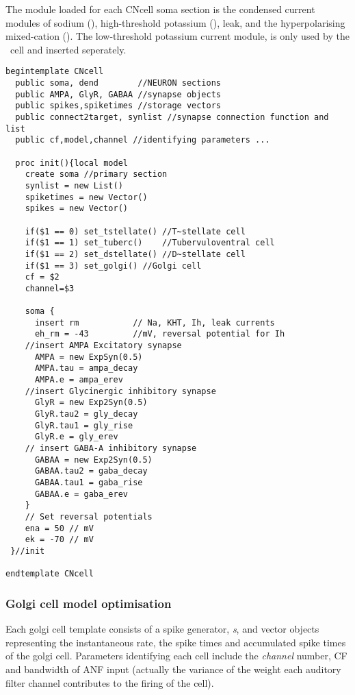 The  module loaded for each \textsf{CNcell} soma section is the condensed
current modules of sodium (), high-threshold potassium (), leak,
and the hyperpolarising mixed-cation ().  The low-threshold potassium
current module, is only used by the \DS~cell and inserted seperately.

\begin{lstlisting}[label=lst:CellTemplate,caption=Rothman and Manis cochlear
  nucleus cell template (in CNcell.tem)]
  begintemplate CNcell 
  public soma, dend        //NEURON sections 
  public AMPA, GlyR, GABAA //synapse objects 
  public spikes,spiketimes //storage vectors 
  public connect2target, synlist //synapse connection function and list 
  public cf,model,channel //identifying parameters ...

  proc init(){local model 
    create soma //primary section
    synlist = new List() 
    spiketimes = new Vector() 
    spikes = new Vector()
    
    if($1 == 0) set_tstellate() //T~stellate cell 
    if($1 == 1) set_tuberc()    //Tubervuloventral cell 
    if($1 == 2) set_dstellate() //D~stellate cell 
    if($1 == 3) set_golgi() //Golgi cell 
    cf = $2 
    channel=$3

    soma { 
      insert rm           // Na, KHT, Ih, leak currents 
      eh_rm = -43         //mV, reversal potential for Ih 
    //insert AMPA Excitatory synapse 
      AMPA = new ExpSyn(0.5) 
      AMPA.tau = ampa_decay 
      AMPA.e = ampa_erev 
    //insert Glycinergic inhibitory synapse 
      GlyR = new Exp2Syn(0.5) 
      GlyR.tau2 = gly_decay 
      GlyR.tau1 = gly_rise 
      GlyR.e = gly_erev 
    // insert GABA-A inhibitory synapse 
      GABAA = new Exp2Syn(0.5) 
      GABAA.tau2 = gaba_decay
      GABAA.tau1 = gaba_rise 
      GABAA.e = gaba_erev 
    } 
    // Set reversal potentials
    ena = 50 // mV 
    ek = -70 // mV 
 }//init
 
endtemplate CNcell

\end{lstlisting}



\subsubsection[Golgi model]{Golgi cell model
  optimisation    \label{sec:APDX:golgi-cell-model}}

Each golgi cell template consists of a spike generator, \emph{s}, and vector
objects representing the instantaneous rate, the spike times and accumulated
spike times of the golgi cell. Parameters identifying each cell include the
\emph{channel} number, CF and bandwidth of ANF input (actually the variance of
the weight each auditory filter channel contributes to the firing of the cell).

